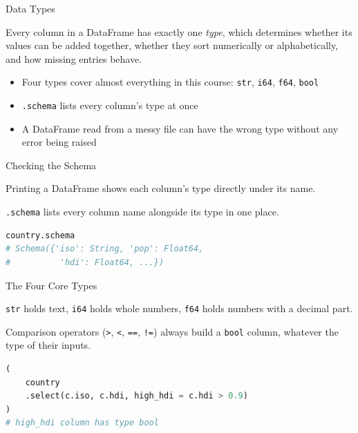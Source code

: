 \documentclass[8pt,aspectratio=169]{beamer}
\begin{document}
\begin{textframe}{Data Types}

Every column in a DataFrame has exactly one \textit{type}, which determines whether its values can be added together, whether they sort numerically or alphabetically, and how missing entries behave.

\begin{itemize}
\item Four types cover almost everything in this course: \texttt{str}, \texttt{i64}, \texttt{f64}, \texttt{bool}
\item \texttt{.schema} lists every column's type at once
\item A DataFrame read from a messy file can have the wrong type without any error being raised
\end{itemize}

\end{textframe}

\begin{frame}[fragile]{Checking the Schema}
\begin{splitcode}{%

Printing a DataFrame shows each column's type directly under its name.

\texttt{.schema} lists every column name alongside its type in one place.

}
\begin{lstlisting}[language=Python]
country.schema
# Schema({'iso': String, 'pop': Float64,
#          'hdi': Float64, ...})
\end{lstlisting}
\end{splitcode}
\end{frame}

\begin{frame}[fragile]{The Four Core Types}
\begin{splitcode}{%

\texttt{str} holds text, \texttt{i64} holds whole numbers, \texttt{f64} holds numbers with a decimal part.

Comparison operators (\texttt{>}, \texttt{<}, \texttt{==}, \texttt{!=}) always build a \texttt{bool} column, whatever the type of their inputs.

}
\begin{lstlisting}[language=Python]
(
    country
    .select(c.iso, c.hdi, high_hdi = c.hdi > 0.9)
)
# high_hdi column has type bool
\end{lstlisting}
\end{splitcode}
\end{frame}
\end{document}
